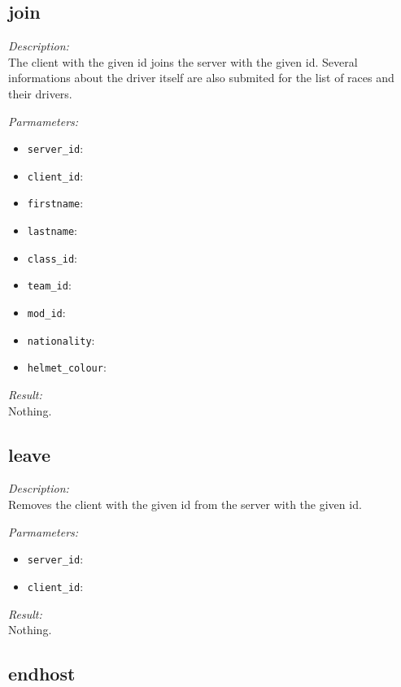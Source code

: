 \subsection{join}

\begin{description}
\item {\it Description:}\\
The client with the given id joins the server with the given id. Several informations about the driver itself are also submited for the list of races and their drivers.
\item {\it Parmameters:}
\begin{itemize}
\item {\tt server\_id}: 
\item {\tt client\_id}: 
\item {\tt firstname}: 
\item {\tt lastname}: 
\item {\tt class\_id}: 
\item {\tt team\_id}: 
\item {\tt mod\_id}: 
\item {\tt nationality}: 
\item {\tt helmet\_colour}: 
\end{itemize}
\item {\it Result:}\\
Nothing.
\end{description}

\subsection{leave}

\begin{description}
\item {\it Description:}\\
Removes the client with the given id from the server with the given id.
\item {\it Parmameters:}
\begin{itemize}
\item {\tt server\_id}: 
\item {\tt client\_id}: 
\end{itemize}
\item {\it Result:}\\
Nothing.
\end{description}

\subsection{endhost}

